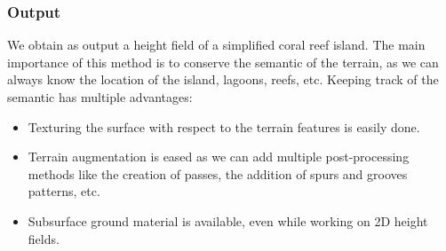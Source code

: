 \subsubsection{Output}
We obtain as output a height field of a simplified coral reef island. The main importance of this method is to conserve the semantic of the terrain, as we can always know the location of the island, lagoons, reefs, etc. Keeping track of the semantic has multiple advantages:
\begin{itemize}
    \item Texturing the surface with respect to the terrain features is easily done.
    \item Terrain augmentation is eased as we can add multiple post-processing methods like the creation of passes, the addition of spurs and grooves patterns, etc.
    \item Subsurface ground material is available, even while working on 2D height fields.
\end{itemize}


